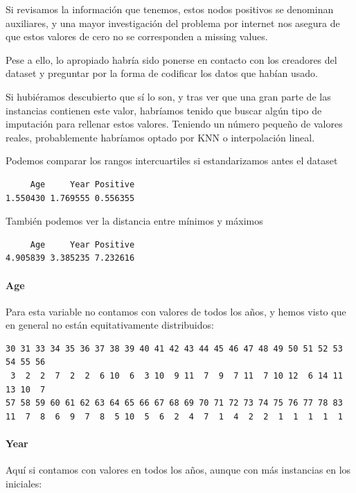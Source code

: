 \vspace{\baselineskip}

Si revisamos la información que tenemos, estos nodos positivos se denominan auxiliares, y una mayor investigación del problema por internet nos asegura de que estos valores de cero no se corresponden a missing values.

Pese a ello, lo apropiado habría sido ponerse en contacto con los creadores del dataset y preguntar por la forma de codificar los datos que habían usado.

\vspace{\baselineskip}

Si hubiéramos descubierto que sí lo son, y tras ver que una gran parte de las instancias contienen este valor, habríamos tenido que buscar algún tipo de imputación para rellenar estos valores. Teniendo un número pequeño de valores reales, probablemente habríamos optado por KNN o interpolación lineal.

\vspace{\baselineskip}

Podemos comparar los rangos intercuartiles si estandarizamos antes el dataset
\begin{verbatim}
     Age     Year Positive 
1.550430 1.769555 0.556355 
\end{verbatim}

También podemos ver la distancia entre mínimos y máximos

\begin{verbatim}
     Age     Year Positive 
4.905839 3.385235 7.232616 
\end{verbatim}


\paragraph{Age}
Para esta variable no contamos con valores de todos los años, y hemos visto que en general no están equitativamente distribuidos:

\begin{verbatim}
30 31 33 34 35 36 37 38 39 40 41 42 43 44 45 46 47 48 49 50 51 52 53 54 55 56 
 3  2  2  7  2  2  6 10  6  3 10  9 11  7  9  7 11  7 10 12  6 14 11 13 10  7 
57 58 59 60 61 62 63 64 65 66 67 68 69 70 71 72 73 74 75 76 77 78 83 
11  7  8  6  9  7  8  5 10  5  6  2  4  7  1  4  2  2  1  1  1  1  1 
\end{verbatim}

\paragraph{Year}
Aquí si contamos con valores en todos los años, aunque con más instancias en los iniciales:

